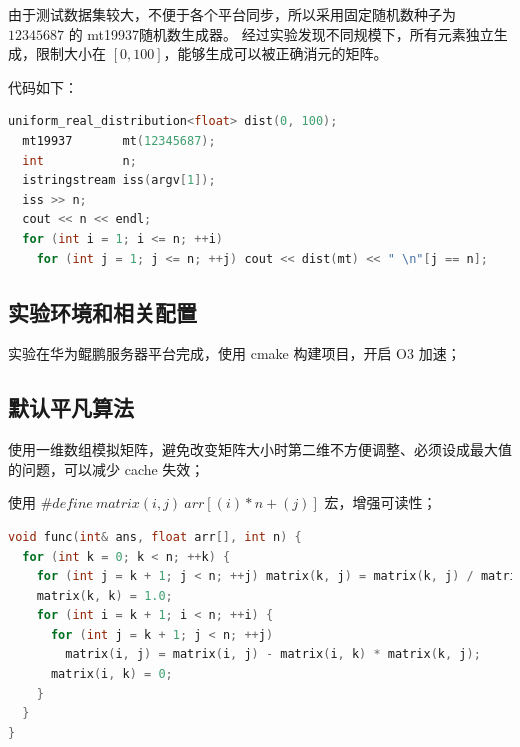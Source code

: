 \documentclass[a4paper]{article}
\begin{document}
由于测试数据集较大，不便于各个平台同步，所以采用固定随机数种子为 $12345687$ 的 mt19937随机数生成器。
经过实验发现不同规模下，所有元素独立生成，限制大小在 $[0, 100]$，能够生成可以被正确消元的矩阵。

代码如下：

\begin{lstlisting}[frame=trbl,language={C++}]
  uniform_real_distribution<float> dist(0, 100);
  mt19937       mt(12345687);
  int           n;
  istringstream iss(argv[1]);
  iss >> n;
  cout << n << endl;
  for (int i = 1; i <= n; ++i)
    for (int j = 1; j <= n; ++j) cout << dist(mt) << " \n"[j == n];
\end{lstlisting}

\subsection{实验环境和相关配置}

实验在华为鲲鹏服务器平台完成，使用 cmake 构建项目，开启 O3 加速；

\subsection{默认平凡算法}

使用一维数组模拟矩阵，避免改变矩阵大小时第二维不方便调整、必须设成最大值的问题，可以减少 cache 失效；

使用 $\#define\ matrix(i, j)\ arr[(i) * n + (j)]$ 宏，增强可读性；

\begin{lstlisting}[frame=trbl,language={C++}]
void func(int& ans, float arr[], int n) {
  for (int k = 0; k < n; ++k) {
    for (int j = k + 1; j < n; ++j) matrix(k, j) = matrix(k, j) / matrix(k, k);
    matrix(k, k) = 1.0;
    for (int i = k + 1; i < n; ++i) {
      for (int j = k + 1; j < n; ++j)
        matrix(i, j) = matrix(i, j) - matrix(i, k) * matrix(k, j);
      matrix(i, k) = 0;
    }
  }
}
\end{lstlisting}
\end{document}
